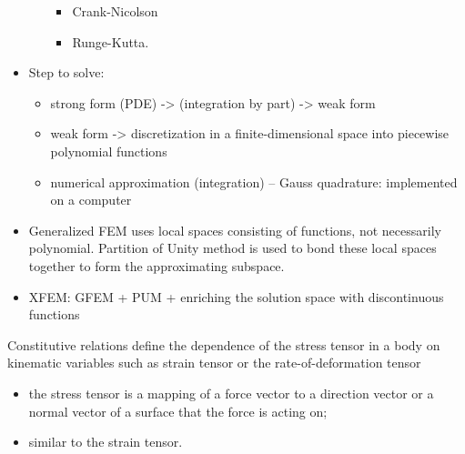 \documentclass[12pt]{report}
\renewcommand{\_}{\kern-1.5pt\textunderscore\kern-1.5pt}
\begin{document}
\begin{itemize}
\begin{itemize}
\begin{itemize}
	\item Crank-Nicolson\par

	\item Runge-Kutta.
\end{itemize}
\end{itemize}\par

	\item Step to solve:\par

\begin{itemize}
	\item strong form (PDE) -> (integration by part) -> weak form\par

	\item weak form -> discretization in a finite-dimensional space into piecewise polynomial functions\par

	\item numerical approximation (integration) – Gauss quadrature: implemented on a computer\par


\end{itemize}
	\item Generalized FEM uses local spaces consisting of functions, not necessarily polynomial. Partition of Unity method is used to bond these local spaces together to form the approximating subspace. \par

	\item XFEM: GFEM + PUM + enriching the solution space with discontinuous functions
\end{itemize}\par

Constitutive relations define the dependence of the stress tensor in a body on kinematic variables such as strain tensor or the rate-of-deformation tensor \par

\begin{itemize}
	\item the stress tensor is a mapping of a force vector to a direction vector or a normal vector of a surface that the force is acting on;\par

	\item similar to the strain tensor.
\end{itemize}\par
\end{document}
